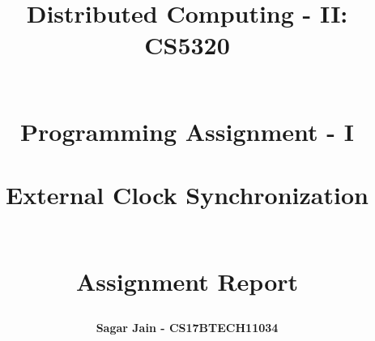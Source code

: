 \documentclass[a4paper,12pt]{report}
\begin{document}
\title{
\textbf{Distributed Computing - II: CS5320}\\~\\
\begin{large}
\textbf{Programming Assignment - I\\~\\External Clock Synchronization
\\~\\}
\end{large}
\begin{large}
\textbf{Assignment Report}
\end{large}
}
\author{\textbf{Sagar Jain - CS17BTECH11034}\\}
\maketitle
\begin{large}
\tableofcontents
\end{large}
\newpage
\end{document}
